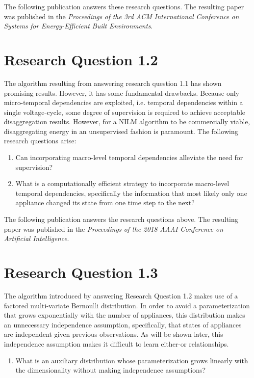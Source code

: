 \documentclass[11pt]{cmuthesis} %
\begin{document}
The following publication answers these research questions. The resulting paper was published in the \emph{Proceedings of the 3rd ACM International Conference on Systems for Energy-Efficient Built Environments}.


\newpage
\section{Research Question 1.2}
The algorithm resulting from answering research question 1.1 has shown promising results. However, it has some fundamental drawbacks. Because only micro-temporal dependencies are exploited, i.e. temporal dependencies within a single voltage-cycle, some degree of supervision is required to achieve acceptable disaggregation results. However, for a NILM algorithm to be commercially viable, disaggregating energy in an unsupervised fashion is paramount. The following research questions arise:

\begin{enumerate}
\item Can incorporating macro-level temporal dependencies alleviate the need for supervision?
\item What is a computationally efficient strategy to incorporate macro-level temporal dependencies, specifically the information that most likely only one appliance changed its state from one time step to the next?
\end{enumerate}

The following publication answers the research questions above. The resulting paper was published in the \emph{Proceedings of the 2018 AAAI Conference on Artificial Intelligence}.



\newpage
\section{Research Question 1.3}

The algorithm introduced by answering Research Question 1.2 makes use of a factored multi-variate Bernoulli distribution. In order to avoid a parameterization that grows exponentially with the number of appliances, this distribution makes an unnecessary independence assumption, specifically, that states of appliances are independent given previous observations. As will be shown later, this independence assumption makes it difficult to learn either-or relationships.

\begin{enumerate}
\item What is an auxiliary distribution whose parameterization grows linearly with the dimensionality without making independence assumptions?
\end{enumerate}
\end{document}
